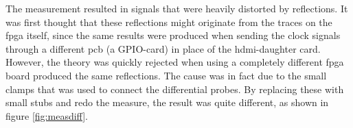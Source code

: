 \documentclass[main.tex]{subfiles}
\begin{document}
\begin{figure}
   \begin{center}
   \end{center}
\end{figure}

The measurement resulted in signals that were heavily distorted by reflections. It was first thought that these reflections might originate from the traces on the \gls{fpga} itself, since the same results were produced when sending the clock signals through a different \gls{pcb} (a GPIO-card) in place of the \gls{hdmi}-daughter card. However, the theory was quickly rejected when using a completely different \gls{fpga} board produced the same reflections. The cause was in fact due to the small clamps that was used to connect the differential probes. By replacing these with small stubs and redo the measure, the result was quite different, as shown in figure \ref{fig:measdiff}.
\end{document}
